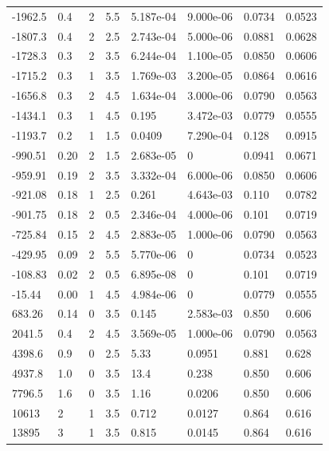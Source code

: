 \documentclass[preview]{standalone}
\begin{document}
{{\begin{tabular}{L{1.2cm}C{1.2cm} C{0.3cm}C{0.5cm} C{1.4cm}C{1.4cm} C{1.4cm}C{1.4cm}}
  -1962.5  &   0.4  & 2     & 5.5 &  5.187e-04  & 9.000e-06  & 0.0734 &  0.0523   \\ 
  -1807.3  &   0.4  & 2     & 2.5 &  2.743e-04  & 5.000e-06  & 0.0881 &  0.0628   \\ 
  -1728.3  &   0.3  & 2     & 3.5 &  6.244e-04  & 1.100e-05  & 0.0850 &  0.0606   \\ 
  -1715.2  &   0.3  & 1     & 3.5 &  1.769e-03  & 3.200e-05  & 0.0864 &  0.0616   \\ 
  -1656.8  &   0.3  & 2     & 4.5 &  1.634e-04  & 3.000e-06  & 0.0790 &  0.0563   \\ 
  -1434.1  &   0.3  & 1     & 4.5 &  0.195  & 3.472e-03  & 0.0779 &  0.0555   \\ 
  -1193.7  &   0.2  & 1     & 1.5 &  0.0409  & 7.290e-04  & 0.128 &  0.0915   \\ 
  -990.51  &  0.20  & 2     & 1.5 &  2.683e-05  & 0  & 0.0941 &  0.0671   \\ 
  -959.91  &  0.19  & 2     & 3.5 &  3.332e-04  & 6.000e-06  & 0.0850 &  0.0606   \\ 
  -921.08  &  0.18  & 1     & 2.5 &  0.261  & 4.643e-03  & 0.110 &  0.0782   \\ 
  -901.75  &  0.18  & 2     & 0.5 &  2.346e-04  & 4.000e-06  & 0.101 &  0.0719   \\ 
  -725.84  &  0.15  & 2     & 4.5 &  2.883e-05  & 1.000e-06  & 0.0790 &  0.0563   \\ 
  -429.95  &  0.09  & 2     & 5.5 &  5.770e-06  & 0  & 0.0734 &  0.0523   \\ 
  -108.83  &  0.02  & 2     & 0.5 &  6.895e-08  & 0  & 0.101 &  0.0719   \\ 
  -15.44  &  0.00  & 1     & 4.5 &  4.984e-06  & 0  & 0.0779 &  0.0555   \\ 
  683.26  &  0.14  & 0     & 3.5 &  0.145  & 2.583e-03  & 0.850 &  0.606   \\ 
  2041.5  &   0.4  & 2     & 4.5 &  3.569e-05  & 1.000e-06  & 0.0790 &  0.0563   \\ 
  4398.6  &   0.9  & 0     & 2.5 &  5.33  & 0.0951  & 0.881 &  0.628   \\ 
  4937.8  &   1.0  & 0     & 3.5 &  13.4  & 0.238  & 0.850 &  0.606   \\ 
  7796.5  &   1.6  & 0     & 3.5 &  1.16  & 0.0206  & 0.850 &  0.606   \\ 
  10613  &     2  & 1     & 3.5 &  0.712  & 0.0127  & 0.864 &  0.616   \\ 
  13895  &     3  & 1     & 3.5 &  0.815  & 0.0145  & 0.864 &  0.616   \\ 

\end{tabular}}}
\end{document}

